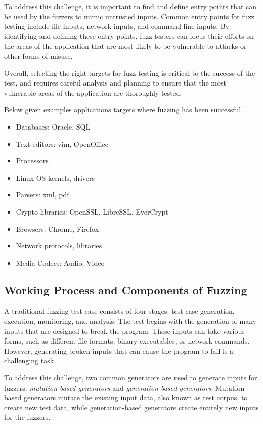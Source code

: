 To address this challenge, it is important to find and define entry points that
can be used by the fuzzers to mimic untrusted inputs. Common entry points for
fuzz testing include file inputs, network inputs, and command line inputs.
By identifying and defining these entry points, fuzz testers can focus their
efforts on the areas of the application that are most likely to be vulnerable
to attacks or other forms of misuse.

Overall, selecting the right targets for fuzz testing is critical to the
success of the test, and requires careful analysis and planning to ensure
that the most vulnerable areas of the application are thoroughly tested.

Below given examples applications targets where fuzzing has been successful.\label{par:target_categories}

\begin{itemize}
        \item Databases: Oracle, SQL
        \item Text editors: vim, OpenOffice
        \item Processors
        \item Linux OS kernels, drivers
        \item Parsers: xml, pdf
        \item Crypto libraries: OpenSSL, LibreSSL, EverCrypt
        \item Browsers: Chrome, Firefox
        \item Network protocols, libraries
        \item Media Codecs: Audio, Video\newline
\end{itemize}


\subsection{Working Process and Components of Fuzzing}

A traditional fuzzing test case consists of four stages: test case generation,
execution, monitoring, and analysis. The test begins with the generation of many
inputs that are designed to break the program. These inputs can take
various forms, such as different file formats, binary executables, or network
commands. However, generating broken inputs that can cause the program to fail
is a challenging task.


To address this challenge, two common generators are used to generate inputs for
fuzzers: \textit{mutation-based generators} and \textit{generation-based generators}.
Mutation-based generators mutate the existing input data, also known as test \gls{corpus},
to create new test data, while generation-based generators create entirely
new inputs for the fuzzers\cite{li2018fuzzing}.


